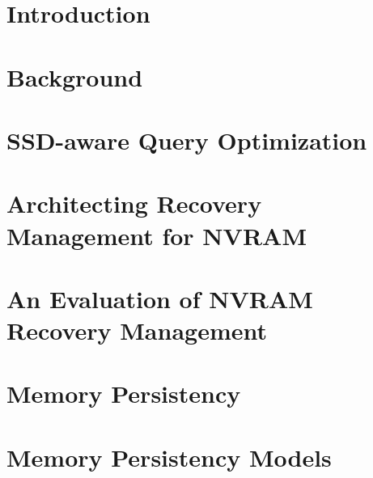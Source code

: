 \documentclass[reqno,12pt,oneside]{report} %
\theoremstyle{plain}
\theoremstyle{definition}
\theoremstyle{remark}
\numberwithin{theorem}{chapter}     %
\begin{document}
 \chapter{Introduction}
 \label{chap:Intro}
 

 \chapter{Background}
 \label{chap:Background}
 

 \chapter{SSD-aware Query Optimization}
 \label{chap:FlashOpti}
 

 \chapter{Architecting Recovery Management for NVRAM}
 \label{chap:OLTP_design}
 

 \chapter{An Evaluation of NVRAM Recovery Management}
 \label{chap:OLTP_eval}
 



 \chapter{Memory Persistency}
 \label{chap:Persistency}
 

 \chapter{Memory Persistency Models}
 \label{chap:PersistencyModels}
 
\end{document}
